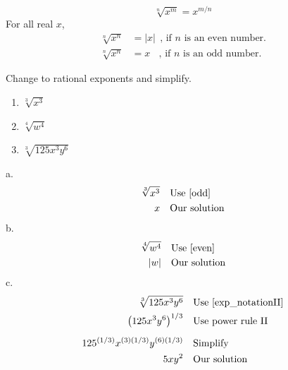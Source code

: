 \begin{tcolorbox}[title=Summary,fonttitle=\bfseries,                               colframe=blue!70!red,
                 colback =white]
	\begin{equation}
	        	\sqrt[n]{x^m} = x^{m/n} \label{exp_notationII}
	\end{equation}
	For all real $x$, 
	\begin{align}
		\sqrt[n]{x^n}&=|x|\ \ \text{, if $n$ is an even number.} \label{even}\\
		\sqrt[n]{x^n}&=x \ \ \ \ \!\text{, if $n$ is an odd number.}\label{odd}
	\end{align} 
\end{tcolorbox}
\begin{exa}
Change to rational exponents and simplify.
\begin{enumerate}[\bfseries a.]
    \item $\sqrt[3]{x^3}$ 
    \item $\sqrt[4]{w^4}$
    \item $\sqrt[3]{125x^3y^6}$
\end{enumerate}
\end{exa}
a.
	\begin{align*}
			\sqrt[3]{x^3}&  &&\text{Use \eqref{odd}}\\
			x&		        &&\text{Our solution}\\
    \end{align*}
b.
    \begin{align*}
			\sqrt[4]{w^4}&  &&\text{Use \eqref{even}}\\
			|w|&	        &&\text{Our solution}\\
    \end{align*}
c.    
    \begin{align*}
			\sqrt[3]{125x^3y^6}& &&\text{Use \eqref{exp_notationII}}\\
			\left(125x^3y^6\right)^{1/3}&	&&\text{Use power rule II}\\[.2cm]
			125^{(1/3)}x^{(3)(1/3)}y^{(6)(1/3)}& &&\text{Simplify}\\
			5xy^2&	&&\text{Our solution}
	\end{align*}
